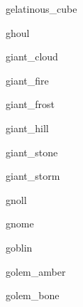 \documentclass[letterpaper,serif]{module}
\begin{document}
\begin{newmonster}{gelatinous_cube}\end{newmonster}

\begin{newmonster}{ghoul}\end{newmonster}

\begin{newmonster}{giant_cloud}\end{newmonster}

\begin{newmonster}{giant_fire}\end{newmonster}

\begin{newmonster}{giant_frost}\end{newmonster}

\begin{newmonster}{giant_hill}\end{newmonster}

\begin{newmonster}{giant_stone}\end{newmonster}

\begin{newmonster}{giant_storm}\end{newmonster}

\begin{newmonster}{gnoll}\end{newmonster}

\begin{newmonster}{gnome}\end{newmonster}

\begin{newmonster}{goblin}\end{newmonster}

\begin{newmonster}{golem_amber}\end{newmonster}

\begin{newmonster}{golem_bone}\end{newmonster}
\end{document}
